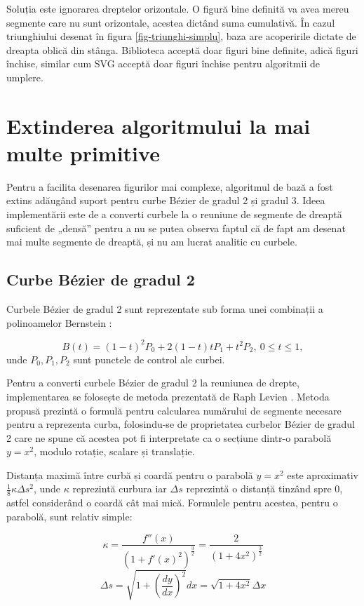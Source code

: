 \documentclass[a4paper, 12pt]{report}
\begin{document}
Soluția este ignorarea dreptelor orizontale. O figură bine definită va avea mereu segmente care nu sunt orizontale,
acestea dictând suma cumulativă. În cazul triunghiului desenat în figura \ref{fig-triunghi-simplu}, baza are acoperirile
dictate de dreapta oblică din stânga. Biblioteca acceptă doar figuri bine definite, adică figuri închise, similar cum SVG
acceptă doar figuri închise pentru algoritmii de umplere.

\chapter{Extinderea algoritmului la mai multe primitive}

Pentru a facilita desenarea figurilor mai complexe, algoritmul de bază a fost extins adăugând suport pentru curbe Bézier
de gradul 2 și gradul 3. Ideea implementării este de a converti curbele la o reuniune de segmente de dreaptă suficient de „densă” pentru
a nu se putea observa faptul că de fapt am desenat mai multe segmente de dreaptă, și nu am lucrat analitic cu curbele.

\section{Curbe Bézier de gradul 2}

Curbele Bézier de gradul 2 sunt reprezentate sub forma unei combinații a polinoamelor Bernstein \cite{bernstein_polynomial}:

\[
    B(t) = (1 - t)^2 P_0 + 2 (1 - t) t P_1 + t^2 P_2, \ 0 \leq t \leq 1,
\] unde \(P_0, P_1, P_2\) sunt punctele de control ale curbei.

Pentru a converti curbele Bézier de gradul 2 la reuniunea de drepte, implementarea se folosește de metoda prezentată de Raph Levien
\cite{FlatteningQuadraticBezierCurves}. Metoda propusă prezintă o formulă pentru calcularea numărului de segmente
necesare pentru a reprezenta curba, folosindu-se de proprietatea curbelor Bézier de gradul 2 care ne spune că acestea
pot fi interpretate ca o secțiune dintr-o parabolă \(y = x^2\), modulo rotație, scalare și translație.

Distanța maximă între curbă și coardă pentru o parabolă \(y = x^2\) este aproximativ \(\frac{1}{8} \kappa \Delta s^2\),
unde \(\kappa\) reprezintă curbura iar \(\Delta s\) reprezintă o distanță tinzând spre 0, astfel considerând o coardă cât mai mică.
Formulele pentru acestea, pentru o parabolă, sunt relativ simple:

\[
    \kappa = \frac{f''(x)}{\left(1 + f'(x)^2\right)^{\frac{3}{2}}} = \frac{2}{\left(1 + 4x^2\right)^{\frac{3}{2}}}
\]
\[
    \Delta s = \sqrt{1 + \left(\frac{dy}{dx}\right)^2} dx = \sqrt{1 + 4x^2} \Delta x
\]
\end{document}
